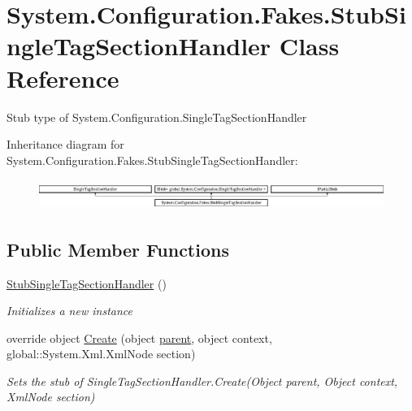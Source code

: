 \hypertarget{class_system_1_1_configuration_1_1_fakes_1_1_stub_single_tag_section_handler}{\section{System.\-Configuration.\-Fakes.\-Stub\-Single\-Tag\-Section\-Handler Class Reference}
\label{class_system_1_1_configuration_1_1_fakes_1_1_stub_single_tag_section_handler}
}


Stub type of System.\-Configuration.\-Single\-Tag\-Section\-Handler 


Inheritance diagram for System.\-Configuration.\-Fakes.\-Stub\-Single\-Tag\-Section\-Handler\-:\begin{figure}[H]
\begin{center}
\leavevmode
\includegraphics[height=0.990274cm]{class_system_1_1_configuration_1_1_fakes_1_1_stub_single_tag_section_handler}
\end{center}
\end{figure}
\subsection*{Public Member Functions}
\begin{DoxyCompactItemize}
\item 
\hyperlink{class_system_1_1_configuration_1_1_fakes_1_1_stub_single_tag_section_handler_a857dc78ebeae423c965c551e62a86647}{Stub\-Single\-Tag\-Section\-Handler} ()
\begin{DoxyCompactList}\small\item\em Initializes a new instance\end{DoxyCompactList}\item 
override object \hyperlink{class_system_1_1_configuration_1_1_fakes_1_1_stub_single_tag_section_handler_a0016947621d7d398f245d4f56cfbfc53}{Create} (object \hyperlink{jquery-1_810_82-vsdoc_8js_aed9b5e7a755bcccb282f9b06c00a6822}{parent}, object context, global\-::\-System.\-Xml.\-Xml\-Node section)
\begin{DoxyCompactList}\small\item\em Sets the stub of Single\-Tag\-Section\-Handler.\-Create(\-Object parent, Object context, Xml\-Node section)\end{DoxyCompactList}\end{DoxyCompactItemize}
